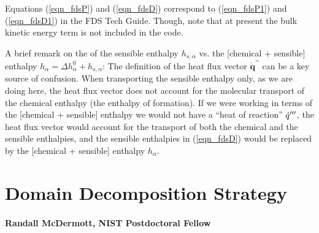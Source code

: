 \documentclass[11pt]{book}
\begin{document}
Equations (\ref{eqn_fdsP}) and (\ref{eqn_fdsD}) correspond to (\ref{eqn_fdsP1}) and (\ref{eqn_fdsD1}) in the FDS Tech Guide.  Though, note that at present the bulk kinetic energy term is not included in the code.

A brief remark on the of the sensible enthalpy $h_{s,\alpha}$ vs. the [chemical + sensible] enthalpy $h_\alpha = \Delta h_\alpha^0 + h_{s,\alpha}$: The definition of the heat flux vector $\dot{\mathbf{q}}^{\prime\prime}$ can be a key source of confusion.  When transporting the sensible enthalpy only, as we are doing here, the heat flux vector does not account for the molecular transport of the chemical enthalpy (the enthalpy of formation).  If we were working in terms of the [chemical + sensible] enthalpy we would not have a ``heat of reaction'' $\dot{q}^{{\prime\prime\prime}}$, the heat flux vector would account for the transport of both the chemical and the sensible enthalpies, and the sensible enthalpies in (\ref{eqn_fdsD}) would be replaced by the [chemical + sensible] enthalpy $h_{\alpha}$.

\chapter{Domain Decomposition Strategy}
\label{app_pressure_correction}

\subsubsection{Randall McDermott, NIST Postdoctoral Fellow}
\end{document}
